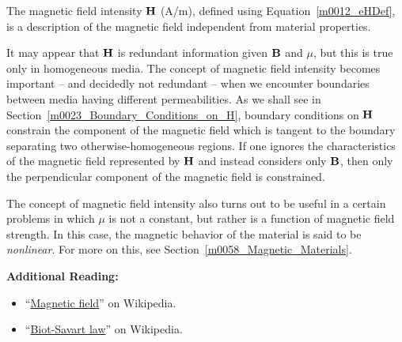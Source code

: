 \begin{mdframed}[backgroundcolor=yellow!20,nobreak=true] 
The magnetic field intensity 
${\bf H}$ (A/m), defined using Equation~\ref{m0012_eHDef}, is a description of the magnetic field independent from material properties. 
\end{mdframed}

It may appear that ${\bf H}$ is redundant information given ${\bf B}$ and $\mu$, but this is true only in homogeneous
media. The concept of magnetic field intensity becomes important -- and decidedly not redundant -- when we encounter boundaries between media having different permeabilities.
As we shall see in Section~\ref{m0023_Boundary_Conditions_on_H}, boundary conditions on ${\bf H}$ constrain the component of the magnetic field which is tangent to the boundary separating two otherwise-homogeneous regions.
If one ignores the characteristics of the magnetic field represented by ${\bf H}$ and instead
considers only ${\bf B}$, then only the perpendicular component of the magnetic field is constrained.

The concept of magnetic field intensity also turns out to be useful in a certain problems in which $\mu$ is not a constant, but rather is a function of magnetic field strength.  In this case, the magnetic behavior of the material is said to be \emph{nonlinear}. 
For more on this, see Section~\ref{m0058_Magnetic_Materials}. 
 

{\bf Additional Reading:}
\begin{itemize}
\item ``\href{https://en.wikipedia.org/wiki/Magnetic_field}{Magnetic field}'' on Wikipedia.
\item ``\href{https://en.wikipedia.org/wiki/Biot-Savart_law}{Biot-Savart law}'' on Wikipedia.
\end{itemize}

